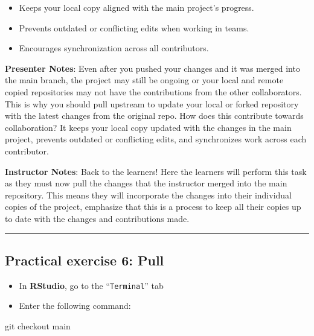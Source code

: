 \documentclass[
  letterpaper,
  DIV=11,
  numbers=noendperiod]{scrartcl}
\newenvironment{Shaded}{\begin{snugshade}}{\end{snugshade}}
\newcommand{\NormalTok}[1]{\textcolor[rgb]{0.00,0.23,0.31}{#1}}
\providecommand{\tightlist}{%
  \setlength{\itemsep}{0pt}\setlength{\parskip}{0pt}}
\begin{document}
\begin{itemize}
\tightlist
\item
  Keeps your local copy aligned with the main project's progress.
\item
  Prevents outdated or conflicting edits when working in teams.
\item
  Encourages synchronization across all contributors.
\end{itemize}

\textbf{Presenter Notes}: Even after you pushed your changes and it was
merged into the main branch, the project may still be ongoing or your
local and remote copied repositories may not have the contributions from
the other collaborators. This is why you should pull upstream to update
your local or forked repository with the latest changes from the
original repo. How does this contribute towards collaboration? It keeps
your local copy updated with the changes in the main project, prevents
outdated or conflicting edits, and synchronizes work across each
contributor.

\textbf{Instructor Notes}: Back to the learners! Here the learners will
perform this task as they must now pull the changes that the instructor
merged into the main repository. This means they will incorporate the
changes into their individual copies of the project, emphasize that this
is a process to keep all their copies up to date with the changes and
contributions made.

\begin{center}\rule{0.5\linewidth}{0.5pt}\end{center}

\subsection{Practical exercise 6: Pull}\label{practical-exercise-6-pull}

\begin{itemize}
\tightlist
\item[$\square$]
  In \textbf{RStudio}, go to the ``\texttt{Terminal}'' tab
\item[$\square$]
  Enter the following command:
\end{itemize}

\begin{Shaded}
\begin{Highlighting}[]
\NormalTok{git checkout main}
\end{Highlighting}
\end{Shaded}
\end{document}
